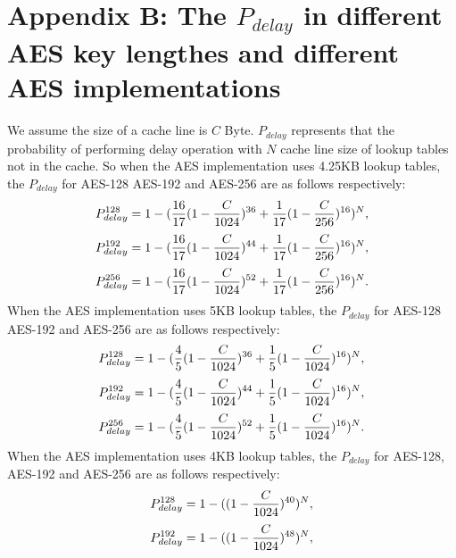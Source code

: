 \section{Appendix B: The $P_{delay}$ in different AES key lengthes and different AES implementations }
\label{appendixb}
We assume the size of a cache line is $C$ Byte. $P_{delay}$ represents that the probability of performing delay operation with $N$ cache line size of lookup tables not in the cache. So when the AES implementation uses 4.25KB lookup tables, the $P_{delay}$ for AES-128 AES-192 and AES-256 are as follows respectively:
\begin{equation}
    \scriptsize
    P_{delay}^{128} = 1- (\frac{16}{17}(1-\frac{C}{1024})^{36}+ \frac{1}{17}(1-\frac{C}{256})^{16})^{N},
\end{equation}
\begin{equation}
    \scriptsize
    P_{delay}^{192} = 1- (\frac{16}{17}(1-\frac{C}{1024})^{44}+ \frac{1}{17}(1-\frac{C}{256})^{16})^{N},
\end{equation}
\begin{equation}
    \scriptsize
    P_{delay}^{256} = 1- (\frac{16}{17}(1-\frac{C}{1024})^{52}+ \frac{1}{17}(1-\frac{C}{256})^{16})^{N}.
\end{equation}
When the AES implementation uses 5KB lookup tables, the $P_{delay}$ for AES-128 AES-192 and AES-256 are as follows respectively:
\begin{equation}
    \scriptsize
    P_{delay}^{128} = 1- (\frac{4}{5}(1-\frac{C}{1024})^{36}+ \frac{1}{5}(1-\frac{C}{1024})^{16})^{N},
\end{equation}
\begin{equation}
    \scriptsize
    P_{delay}^{192} = 1- (\frac{4}{5}(1-\frac{C}{1024})^{44}+ \frac{1}{5}(1-\frac{C}{1024})^{16})^{N},
\end{equation}
\begin{equation}
    \scriptsize
    P_{delay}^{256} = 1- (\frac{4}{5}(1-\frac{C}{1024})^{52}+ \frac{1}{5}(1-\frac{C}{1024})^{16})^{N}.
\end{equation}
When the AES implementation uses 4KB lookup tables, the $P_{delay}$ for AES-128, AES-192 and AES-256 are as follows respectively:
\begin{equation}
    \scriptsize
    P_{delay}^{128} = 1- ((1-\frac{C}{1024})^{40})^{N},
\end{equation}
\begin{equation}
    \scriptsize
    P_{delay}^{192} = 1- ((1-\frac{C}{1024})^{48})^{N},
\end{equation}
